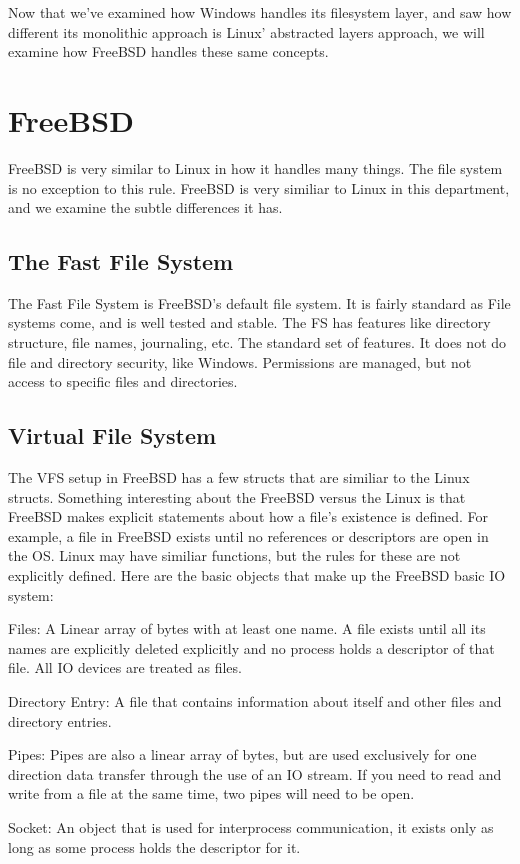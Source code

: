 \documentclass[10pt,letterpaper,onecolumn,draftclsnofoot]{IEEEtran}
\begin{document}
  Now that we've examined how Windows handles its filesystem layer, and saw how
  different its monolithic approach is Linux' abstracted layers approach, we will
  examine how FreeBSD handles these same concepts.

\section{FreeBSD}
  FreeBSD is very similar to Linux in how it handles many things. The file system
  is no exception to this rule. FreeBSD is very similiar to Linux in this department,
  and we examine the subtle differences it has.
 \subsection{The Fast File System}
 The Fast File System is FreeBSD's default file system. It is fairly standard as
 File systems come, and is well tested and stable. The FS has features like directory
 structure, file names, journaling, etc. The standard set of features. It does not
 do file and directory security, like Windows. Permissions are managed, but not access
 to specific files and directories.

 \subsection{Virtual File System}
 The VFS setup in FreeBSD has a few structs that are similiar to the Linux structs.
 Something interesting about the FreeBSD versus the Linux is that FreeBSD
 makes explicit statements about how a file's existence is defined. For example,
 a file in FreeBSD exists until no references or descriptors are open in the OS.
 Linux may have similiar functions, but the rules for these are not explicitly
 defined. Here are the basic objects that make up the FreeBSD basic IO system:
 \cite{freebsd2016}
 \begin{description}
   \item Files: A Linear array of bytes with at least one name. A file exists
   until all its names are explicitly deleted explicitly and no process holds a
   descriptor of that file. All IO devices are treated as files.
   \item Directory Entry: A file that contains information about itself and
   other files and directory entries.
   \item Pipes: Pipes are also a linear array of bytes, but are used exclusively
   for one direction data transfer through the use of an IO stream. If you need
   to read and write from a file at the same time, two pipes will need to be open.
   \item Socket: An object that is used for interprocess communication, it exists
   only as long as some process holds the descriptor for it.
 \end{description}
\end{document}

